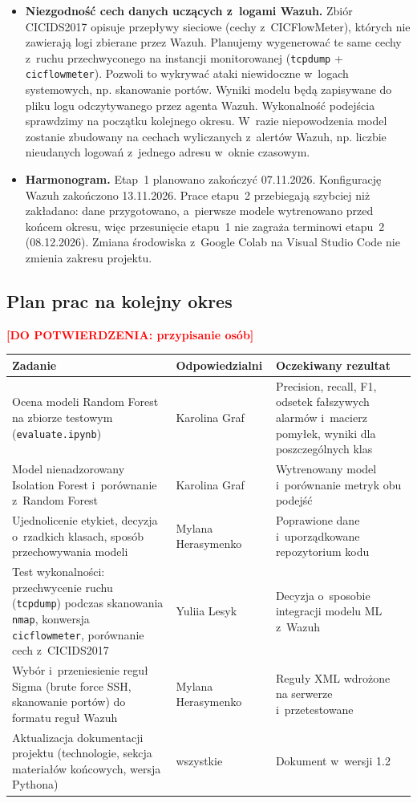 \documentclass[11pt,a4paper,oneside]{article}
\newif\ifpodpowiedzi
\newcommand{\podpowiedz}[1]{\ifpodpowiedzi\par\begingroup\small\color{hintcolor}\textit{Wskazówka: #1}\par\endgroup\fi}
\newcommand{\dopotw}[1]{\textcolor{red}{\textbf{[DO POTWIERDZENIA: #1]}}}
\newcommand{\studentA}{{Karolina Graf}}
\newcommand{\studentB}{{Yuliia Lesyk}}
\newcommand{\studentC}{{Mylana Herasymenko}}
\begin{document}
\begin{itemize}
\item \textbf{Niezgodność cech danych uczących z~logami Wazuh.} Zbiór CICIDS2017 opisuje przepływy sieciowe (cechy z~CICFlowMeter), których nie zawierają logi zbierane przez Wazuh. Planujemy wygenerować te same cechy z~ruchu przechwyconego na instancji monitorowanej (\texttt{tcpdump} + \texttt{cicflowmeter}). Pozwoli to wykrywać ataki niewidoczne w~logach systemowych, np. skanowanie portów. Wyniki modelu będą zapisywane do pliku logu odczytywanego przez agenta Wazuh. Wykonalność podejścia sprawdzimy na początku kolejnego okresu. W~razie niepowodzenia model zostanie zbudowany na cechach wyliczanych z~alertów Wazuh, np. liczbie nieudanych logowań z~jednego adresu w~oknie czasowym.
\item \textbf{Harmonogram.} Etap~1 planowano zakończyć 07.11.2026. Konfigurację Wazuh zakończono 13.11.2026. Prace etapu~2 przebiegają szybciej niż zakładano: dane przygotowano, a~pierwsze modele wytrenowano przed końcem okresu, więc przesunięcie etapu~1 nie zagraża terminowi etapu~2 (08.12.2026). Zmiana środowiska z~Google Colab na Visual Studio Code nie zmienia zakresu projektu.
\end{itemize}

\subsection{Plan prac na kolejny okres}\label{sec:plan}
\podpowiedz{Wymień zadania do kolejnego spotkania, osoby odpowiedzialne oraz oczekiwane rezultaty. Uwzględnij zadania niezakończone i zależności między pracami.}
\dopotw{przypisanie osób}

\begin{tabularx}{\textwidth}{@{}Y p{0.25\textwidth} Y@{}}
\toprule
Zadanie & Odpowiedzialni & Oczekiwany rezultat\\
\midrule
Ocena modeli Random Forest na zbiorze testowym (\texttt{evaluate.ipynb}) & \studentA & Precision, recall, F1, odsetek fałszywych alarmów i~macierz pomyłek, wyniki dla poszczególnych klas\\
Model nienadzorowany Isolation Forest i~porównanie z~Random Forest & \studentA & Wytrenowany model i~porównanie metryk obu podejść\\
Ujednolicenie etykiet, decyzja o~rzadkich klasach, sposób przechowywania modeli & \studentC & Poprawione dane i~uporządkowane repozytorium kodu\\
Test wykonalności: przechwycenie ruchu (\texttt{tcpdump}) podczas skanowania \texttt{nmap}, konwersja \texttt{cicflowmeter}, porównanie cech z~CICIDS2017 & \studentB & Decyzja o~sposobie integracji modelu ML z~Wazuh\\
Wybór i~przeniesienie reguł Sigma (brute force SSH, skanowanie portów) do formatu reguł Wazuh & \studentC & Reguły XML wdrożone na serwerze i~przetestowane\\
Aktualizacja dokumentacji projektu (technologie, sekcja materiałów końcowych, wersja Pythona) & wszystkie & Dokument w~wersji 1.2\\
\bottomrule
\end{tabularx}
\end{document}
